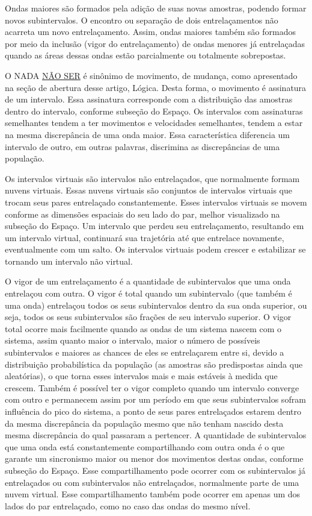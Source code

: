 Ondas maiores são formados pela adição de suas novas amostras, podendo formar novos subintervalos. O encontro ou separação de dois entrelaçamentos não acarreta um novo entrelaçamento. Assim, ondas maiores também são formados por meio da inclusão (vigor do entrelaçamento) de ondas menores já entrelaçadas quando as áreas dessas ondas estão parcialmente ou totalmente sobrepostas. 

O NADA \underline{NÃO SER} é sinônimo de movimento, de mudança, como apresentado na seção de abertura desse artigo, Lógica. Desta forma, o movimento é assinatura de um intervalo. Essa assinatura corresponde com a distribuição das amostras dentro do intervalo, conforme subseção do Espaço. Os intervalos com assinaturas semelhantes tendem a ter movimentos e velocidades semelhantes, tendem a estar na mesma discrepância de uma onda maior. Essa característica diferencia um intervalo de outro, em outras palavras, discrimina as discrepâncias de uma população.

Os intervalos virtuais são intervalos não entrelaçados, que normalmente formam nuvens virtuais. Essas nuvens virtuais são conjuntos de intervalos virtuais que trocam seus pares entrelaçado constantemente. Esses intervalos virtuais se movem conforme as dimensões espaciais do seu lado do par, melhor visualizado na subseção do Espaço. Um intervalo que perdeu seu entrelaçamento, resultando em um intervalo virtual, continuará sua trajetória até que entrelace novamente, eventualmente com um salto. Os intervalos virtuais podem crescer e estabilizar se tornando um intervalo não virtual.

O vigor de um entrelaçamento é a quantidade de subintervalos que uma onda entrelaçou com outra. O vigor é total quando um subintervalo (que também é uma onda) entrelaçou todos os seus subintervalos dentro da sua onda superior, ou seja, todos os seus subintervalos são frações de seu intervalo superior. O vigor total ocorre mais facilmente quando as ondas de um sistema nascem com o sistema, assim quanto maior o intervalo, maior o número de possíveis subintervalos e maiores as chances de eles se entrelaçarem entre si, devido a distribuição probabilística da população (as amostras são predispostas ainda que aleatórias), o que torna esses intervalos mais e mais estáveis à medida que crescem. Também é possível ter o vigor completo quando um intervalo converge com outro e permanecem assim por um período em que seus subintervalos sofram influência do pico do sistema, a ponto de seus pares entrelaçados estarem dentro da mesma discrepância da população mesmo que não tenham nascido desta mesma discrepância do qual passaram a pertencer. A quantidade de subintervalos que uma onda está constantemente compartilhando com outra onda é o que garante um sincronismo maior ou menor dos movimentos destas ondas, conforme subseção do Espaço. Esse compartilhamento pode ocorrer com os subintervalos já entrelaçados ou com subintervalos não entrelaçados, normalmente parte de uma nuvem virtual. Esse compartilhamento também pode ocorrer em apenas um dos lados do par entrelaçado, como no caso das ondas do mesmo nível.

